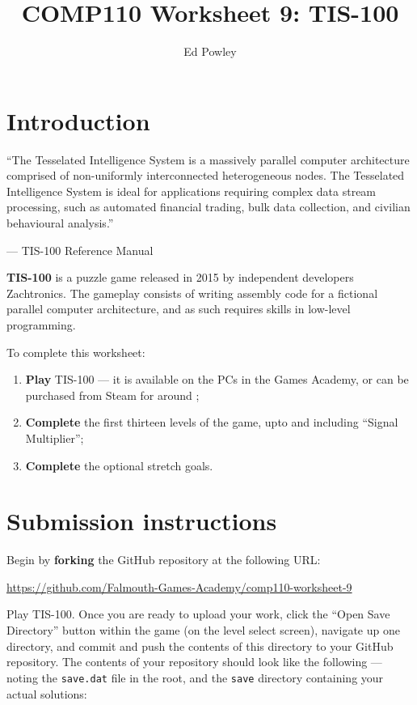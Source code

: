 \documentclass{../../../fal_assignment}
\title{COMP110 Worksheet 9: TIS-100}
\author{Ed Powley}
\begin{document}
\maketitle

\section*{Introduction}

\begin{marginquote}
``The Tesselated Intelligence System is a massively parallel computer architecture comprised of non-uniformly
interconnected heterogeneous nodes. The Tesselated Intelligence System is ideal for applications requiring complex
data stream processing, such as automated financial trading, bulk data collection, and civilian behavioural analysis.''

--- TIS-100 Reference Manual
\end{marginquote}

\textbf{TIS-100} is a puzzle game released in 2015 by independent developers Zachtronics.
The gameplay consists of writing assembly code for a fictional parallel computer architecture,
and as such requires skills in low-level programming.

To complete this worksheet:
\begin{enumerate}[label=(\alph*)]
	\item \textbf{Play} TIS-100 --- it is available on the PCs in the Games Academy, or can be purchased from Steam for around ;
 	\item \textbf{Complete} the first thirteen levels of the game, upto and including ``Signal Multiplier'';
 	\item \textbf{Complete} the optional stretch goals.
\end{enumerate}

\section*{Submission instructions}

Begin by \textbf{forking} the GitHub repository at the following URL:

\url{https://github.com/Falmouth-Games-Academy/comp110-worksheet-9}

Play TIS-100.
Once you are ready to upload your work, click the ``Open Save Directory'' button within the game (on the level select screen),
navigate up one directory, and commit and push the contents of this directory to your GitHub repository.
The contents of your repository should look like the following --- noting the \texttt{save.dat} file in the root,
and the \texttt{save} directory containing your actual solutions:
\end{document}
